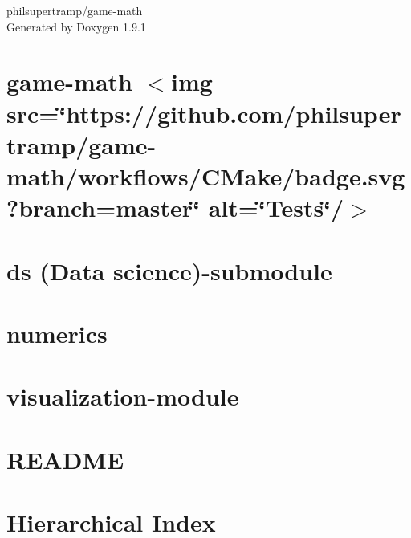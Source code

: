 \let\mypdfximage\pdfximage\def\pdfximage{\immediate\mypdfximage}\documentclass[twoside]{book}
\newcommand{\+}{\discretionary{\mbox{\scriptsize$\hookleftarrow$}}{}{}}
\newcommand{\clearemptydoublepage}{%
  \newpage{\pagestyle{empty}\cleardoublepage}%
}
\begin{document}
\raggedbottom

\hypersetup{pageanchor=false,
             bookmarksnumbered=true,
             pdfencoding=unicode
            }
\begin{titlepage}
\vspace*{7cm}
\begin{center}%
{\Large philsupertramp/game-\/math }\\
\vspace*{1cm}
{\large Generated by Doxygen 1.9.1}\\
\end{center}
\end{titlepage}
\clearemptydoublepage
{}
\tableofcontents
\clearemptydoublepage
{}
\hypersetup{pageanchor=true}

\chapter{game-\/math $<$img src=\char`\"{}https\+://github.\+com/philsupertramp/game-\/math/workflows/\+CMake/badge.\+svg?branch=master\char`\"{} alt=\char`\"{}\+Tests\char`\"{}/$>$}
\label{index}\hypertarget{index}{}
\chapter{ds (Data science)-\/submodule}
\label{md_include_math_ds_README}

\chapter{numerics}
\label{md_include_math_numerics_docs_README}

\chapter{visualization-\/module}
\label{md_include_math_visualization_README}

\chapter{README}
\label{md_include_math_symb_README}

\chapter{Hierarchical Index}

\end{document}
